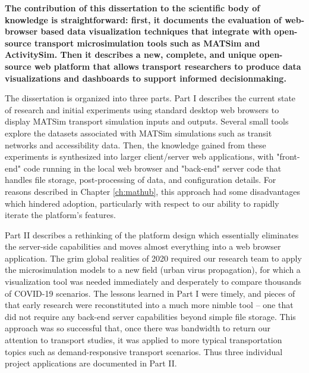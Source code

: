 \textbf{The contribution of this dissertation to the scientific body of knowledge is straightforward: first, it documents the evaluation of web-browser based data visualization techniques that integrate with open-source transport microsimulation tools such as MATSim and ActivitySim. Then it describes a new, complete, and unique open-source web platform that allows transport researchers to produce data visualizations and dashboards to support informed decisionmaking.}

The dissertation is organized into three parts. Part I describes the current state of research and initial experiments using standard desktop web browsers to display MATSim transport simulation inputs and outputs. Several small tools explore the datasets associated with MATSim simulations such as transit networks and accessibility data. Then, the knowledge gained from these experiments is synthesized into larger client/server web applications, with "front-end" code running in the local web browser and "back-end" server code that handles file storage, post-processing of data, and configuration details. For reasons described in Chapter \ref{ch:mathub}, this approach had some disadvantages which hindered adoption, particularly with respect to our ability to rapidly iterate the platform's features.

Part II describes a rethinking of the platform design which essentially eliminates the server-side capabilities and moves almost everything into a web browser application. The grim global realities of 2020 required our research team to apply the microsimulation models to a new field (urban virus propagation), for which a visualization tool was needed immediately and desperately to compare thousands of COVID-19 scenarios. The lessons learned in Part I were timely, and pieces of that early research were reconstituted into a much more nimble tool -- one that did not require any back-end server capabilities beyond simple file storage. This approach was so successful that, once there was bandwidth to return our attention to transport studies, it was applied to more typical transportation topics such as demand-responsive transport scenarios. Thus three individual project applications are documented in Part II.

